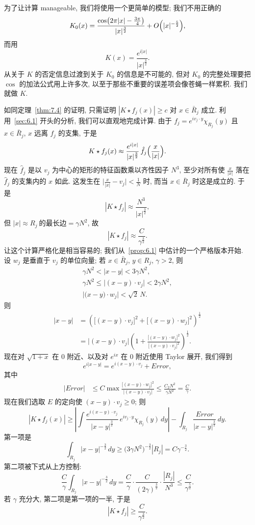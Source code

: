 为了让计算 manageable, 我们将使用一个更简单的模型; 我们不用正确的
\[
K_{0}(x)=\frac{\cos\bigl(2\pi|x|-\frac{3\pi}{4}\bigr)}{|x|^{\frac{3}{2}}}+O\Bigl(|x|^{-\frac{5}{2}}\Bigr),
\]
而用
\[
K(x)=\frac{e^{i|x|}}{|x|^{\frac{3}{2}}}.
\]
从关于 $K$ 的否定信息过渡到关于 $K_{0}$ 的信息是不可能的, 但对 $K_{0}$ 的完整处理要把 $\cos$ 的加法公式用上许多次, 以至于那些不重要的误差项会像苍蝇一样累积. 我们就做 $K$.

如同定理~\ref{thm:7.4} 的证明, 只需证明 $|K\star f_j(x)|\geq c$ 对 $x\in\bar{R}_j$ 成立. 利用~\ref*{sec:6.1} 开头的分析, 我们可以直观地完成计算. 由于 $f_j=e^{iv_j\cdot y}\chi_{R_j}(y)$ 且 $x\in\bar{R}_j$, $x$ 远离 $f_j$ 的支集, 于是
\[
K\star f_{j}(x)\approx\frac{e^{i|x|}}{|x|^{\frac{3}{2}}}\,\hat{f}_{j}\Bigl(\frac{x}{|x|}\Bigr).
\]
现在 $\hat{f}_j$ 是以 $v_j$ 为中心的矩形的特征函数乘以齐性因子 $N^{3}$, 至少对所有使 $\frac{x}{|x|}$ 落在 $\hat{f}_j$ 的支集内的 $x$ 如此. 这发生在 $\bigl|\frac{x}{|x|}-v_j\bigr|<\frac{1}{N}$ 时, 而当 $x\in\bar{R}_j$ 时这是成立的. 于是
\[
|K\star f_{j}|\approx\frac{N^{3}}{|x|^{\frac{3}{2}}},
\]
但 $|x|\approx R_j\ \text{的最长边}=\gamma N^2$, 故
\[
|K\star f_{j}|\approx\frac{C}{\gamma^{\frac{3}{2}}}.
\]
让这个计算严格化是相当容易的; 我们从~\ref*{prop:6.1} 中估计的一个严格版本开始. 设 $w_j$ 是垂直于 $v_j$ 的单位向量; 若 $x\in\bar{R}_j$, $y\in R_j$, $\gamma>2$, 则
\begin{gather*}
\gamma N^{2}<|x-y|<3\gamma N^{2}, \\
\gamma N^{2}\leq\bigl|(x-y)\cdot v_{j}\bigr|<2\gamma N^{2}, \\
\bigl|\bigl(x-y\bigr)\cdot w_{j}\bigr|<\sqrt{2}\,N.
\end{gather*}
则
\begin{align*}
|x-y|&=\left(\bigl[(x-y)\cdot v_{j}\bigr]^{2}+\bigl[(x-y)\cdot w_{j}\bigr]^{2}\right)^{\frac{1}{2}} \\
&=\bigl|(x-y)\cdot v_{j}\bigr|\left(1+\frac{\bigl[(x-y)\cdot w_{j}\bigr]^{2}}{\bigl[(x-y)\cdot v_{j}\bigr]^{2}}\right)^{\frac{1}{2}}.
\end{align*}
现在对 $\sqrt{1+x}$ 在 $0$ 附近、以及对 $e^{ix}$ 在 $0$ 附近使用 Taylor 展开, 我们得到
\[
e^{i|x-y|}=e^{i(x-y)\cdot v_{j}}+Error,
\]
其中
\begin{align*}
|Error|&\leq C\max\frac{\bigl[(x-y)\cdot w_{j}\bigr]^{2}}{\bigl|(x-y)\cdot v_{j}\bigr|}
\leq\frac{C_2N^{2}}{\gamma N^{2}}=\frac{C}{\gamma}.
\end{align*}
现在我们选取 $E$ 的定向使 $(x-y)\cdot v_j\geq 0$; 则
\[
|K\star f_{j}(x)|
\geq\left|\int\frac{e^{i(x-y)\cdot v_{j}}}{|x-y|^{\frac{3}{2}}}\,e^{iv_{j}\cdot y}\chi_{R_{j}}(y)\,dy\right|
-\int_{R_{j}}\frac{Error}{|x-y|^{\frac{3}{2}}}\,dy.
\]
第一项是
\[
\int_{R_{j}}|x-y|^{-\frac{3}{2}}\,dy\geq\bigl(3\gamma N^{2}\bigr)^{-\frac{3}{2}}|R_{j}|=C\gamma^{-\frac{3}{2}}.
\]
第二项被下式从上方控制:
\[
\frac{C}{\gamma}\int_{R_{j}}|x-y|^{-\frac{3}{2}}\,dy
=\frac{C}{\gamma}\cdot\frac{C}{(2\gamma)^{\frac{3}{2}}}\cdot\frac{|R_{j}|}{N^{3}}
\leq\frac{C}{\gamma^{\frac{5}{2}}}.
\]
若 $\gamma$ 充分大, 第二项是第一项的一半, 于是
\[
|K\star f_{j}|\geq\frac{C}{\gamma^{\frac{3}{2}}}.
\]

